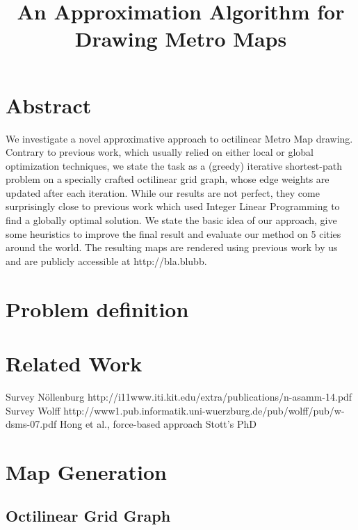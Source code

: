 \documentclass{sig-alternate-sigmod09}
\begin{document}
\title{An Approximation Algorithm for Drawing Metro Maps}


\maketitle

\section{Abstract}

We investigate a novel approximative approach to octilinear Metro Map drawing. Contrary to previous work, which usually relied on either local or global optimization techniques, we state the task as a (greedy) iterative shortest-path problem on a specially crafted octilinear grid graph, whose edge weights are updated after each iteration. While our results are not perfect, they come surprisingly close to previous work which used Integer Linear Programming to find a globally optimal solution. We state the basic idea of our approach, give some heuristics to improve the final result and evaluate our method on 5 cities around the world. The resulting maps are rendered using previous work by us and are publicly accessible at http://bla.blubb. 

\section{Problem definition}

\section{Related Work}

Survey Nöllenburg http://i11www.iti.kit.edu/extra/publications/n-asamm-14.pdf
Survey Wolff http://www1.pub.informatik.uni-wuerzburg.de/pub/wolff/pub/w-dsms-07.pdf
Hong et al., force-based approach
Stott's PhD



\section{Map Generation}

\subsection{Octilinear Grid Graph}
\end{document}
